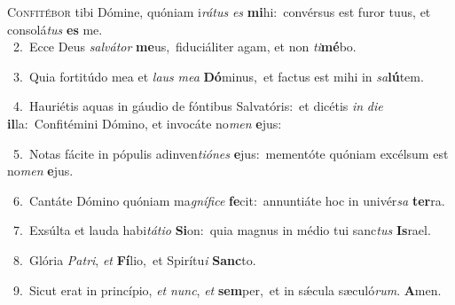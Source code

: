 \lettrine{\initial\textcolor{\initialcolor}{C}}{onfitébor} tibi Dómine, quóniam i\-\textit{rá}\-\textit{tus} \textit{es} \textbf{mi}\-hi:~\star convérsus est furor tuus, et consolá\textit{tus} \textbf{es} me.\\
{\numbfont\textcolor{\numbcolor}{~2.}}~Ecce Deus \textit{sal}\-\textit{vá}\textit{tor} \textbf{me}\-us,~\star fiduciáliter agam, et non \textit{ti}\-\textbf{mé}bo.\par
{\numbfont\textcolor{\numbcolor}{~3.}}~Quia fortitúdo mea et \textit{laus} \textit{me}\-\textit{a} \textbf{Dó}\-minus,~\star et factus est mihi in \textit{sa}\-\textbf{lú}tem.\par
{\numbfont\textcolor{\numbcolor}{~4.}}~Hauriétis aquas in gáudio de fóntibus Salvatóris:~\dagger et dicétis \textit{in} \textit{di}\-\textit{e} \textbf{il}\-la:~\star Confitémini Dómino, et invocáte no\textit{men} \textbf{e}\-jus:\par
{\numbfont\textcolor{\numbcolor}{~5.}}~Notas fácite in pópulis adinven\-\textit{ti}\-\textit{ó}\textit{nes} \textbf{e}\-jus:~\star mementóte quóniam excélsum est no\textit{men} \textbf{e}\-jus.\par
{\numbfont\textcolor{\numbcolor}{~6.}}~Cantáte Dómino quóniam ma\-\textit{gní}\-\textit{fi}\textit{ce} \textbf{fe}\-cit:~\star annuntiáte hoc in univér\textit{sa} \textbf{ter}\-ra.\par
{\numbfont\textcolor{\numbcolor}{~7.}}~Exsúlta et lauda habi\-\textit{tá}\-\textit{ti}\textit{o} \textbf{Si}\-on:~\star quia magnus in médio tui sanc\textit{tus} \textbf{Is}\-rael.\par
{\numbfont\textcolor{\numbcolor}{~8.}}~Glória \textit{Pa}\-\textit{tri}, \textit{et} \textbf{Fí}\-lio,~\star et Spirítu\textit{i} \textbf{Sanc}\-to.\par
{\numbfont\textcolor{\numbcolor}{~9.}}~Sicut erat in princípio, \textit{et} \textit{nunc}\-, \textit{et} \textbf{sem}\-per,~\star et in sǽcula sæculó\-\textit{rum}\-. \textbf{A}\-men.\par
